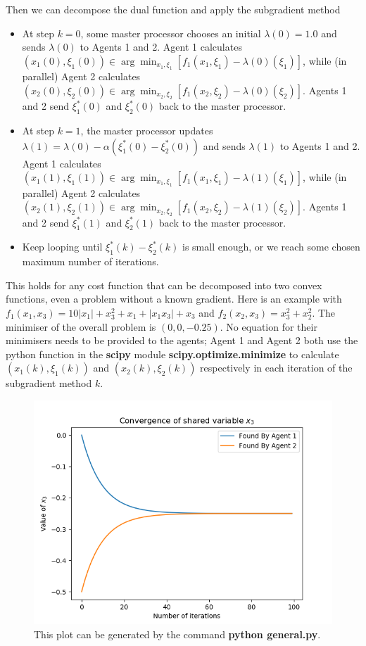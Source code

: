 \documentclass[12pt]{article}
\begin{document}
Then we can decompose the dual function and apply the subgradient method
\begin{itemize}
	\item At step $k=0$, some master processor chooses an initial $\lambda(0)=1.0$ and sends $\lambda(0)$ to Agents 1 and 2. Agent 1 calculates $(x_1(0),\xi_1(0))\in\arg\min_{x_1,\xi_1}[f_1(x_1,\xi_1)-\lambda(0)(\xi_1)]$, while (in parallel) Agent 2 calculates $(x_2(0),\xi_2(0))\in\arg\min_{x_2,\xi_2}[f_1(x_2,\xi_2)-\lambda(0)(\xi_2)]$. Agents 1 and 2 send $\xi_1^*(0)$ and $\xi_2^*(0)$ back to the master processor.
	\item At step $k=1$, the master processor updates $\lambda(1)=\lambda(0)-\alpha(\xi_1^*(0)-\xi_2^*(0))$ and sends $\lambda(1)$ to Agents 1 and 2. Agent 1 calculates $(x_1(1),\xi_1(1))\in\arg\min_{x_1,\xi_1}[f_1(x_1,\xi_1)-\lambda(1)(\xi_1)]$, while (in parallel) Agent 2 calculates $(x_2(1),\xi_2(1))\in\arg\min_{x_2,\xi_2}[f_1(x_2,\xi_2)-\lambda(1)(\xi_2)]$. Agents 1 and 2 send $\xi_1^*(1)$ and $\xi_2^*(1)$ back to the master processor.
	\item Keep looping until $\xi_1^*(k)-\xi_2^*(k)$ is small enough, or we reach some chosen maximum number of iterations.
\end{itemize}

This holds for any cost function that can be decomposed into two convex functions, even a problem without a known gradient. Here is an example with $f_1(x_1,x_3)=10|x_1|+x_3^2+x_1+|x_1x_3|+x_3$ and $f_2(x_2,x_3)=x_3^2 + x_2^2$. The minimiser of the overall problem is $(0,0,-0.25)$. No equation for their minimisers needs to be provided to the agents; Agent 1 and Agent 2 both use the python function in the \textbf{scipy} module \textbf{scipy.optimize.minimize} to calculate $(x_1(k),\xi_1(k))$ and $(x_2(k),\xi_2(k))$ respectively in each iteration of the subgradient method $k$.

\begin{figure}[H]
	\centering
	\includegraphics[scale=0.5]{Problem1-General.png}
	\caption{This plot can be generated by the command \textbf{python general.py}.}
\end{figure}
\end{document}
